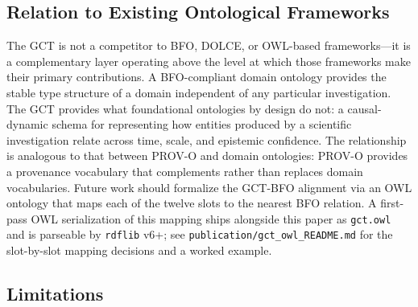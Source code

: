 \documentclass{iosart2x}
\begin{document}
\subsection{Relation to Existing Ontological Frameworks}

The GCT is not a competitor to BFO, DOLCE, or OWL-based frameworks---it is a complementary layer operating above the level at which those frameworks make their primary contributions. A BFO-compliant domain ontology provides the stable type structure of a domain independent of any particular investigation. The GCT provides what foundational ontologies by design do not: a causal-dynamic schema for representing how entities produced by a scientific investigation relate across time, scale, and epistemic confidence. The relationship is analogous to that between PROV-O and domain ontologies: PROV-O provides a provenance vocabulary that complements rather than replaces domain vocabularies. Future work should formalize the GCT-BFO alignment via an OWL ontology that maps each of the twelve slots to the nearest BFO relation. A first-pass OWL serialization of this mapping ships alongside this paper as \texttt{gct.owl} and is parseable by \texttt{rdflib} v6+; see \texttt{publication/gct\_owl\_README.md} for the slot-by-slot mapping decisions and a worked example.

\subsection{Limitations}
\end{document}
